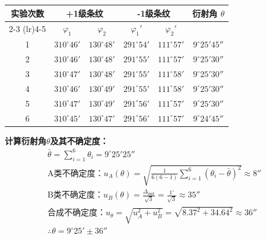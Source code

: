 \documentclass[10pt,a4paper]{ctexart}
\begin{document}
    \begin{table}[H] %
    \centering 
    \label{tab:my_experiment} 
    \begin{tabular}{*{6}{c}}
        \toprule
        \multirow{2}{*}{实验次数} & \multicolumn{2}{c}{+1级条纹} & \multicolumn{2}{c}{-1级条纹} & \multirow{2}{*}{衍射角 $\theta$} \\
        \cmidrule(lr){2-3} \cmidrule(lr){4-5}
        & \multicolumn{1}{c|}{$\varphi _1$} & $\varphi _2$ & \multicolumn{1}{c|}{$\varphi _1'$} & $\varphi _2'$ &  \\ %
        
        \midrule
        1 & $310^\circ46'$& $130^\circ48'$& $291^\circ54'$& $111^\circ57'$& $9^\circ25'45''$ \\

        2 & $310^\circ46'$& $130^\circ48'$& $291^\circ55'$& $111^\circ57'$& $9^\circ25'30''$ \\

        3 & $310^\circ47'$& $130^\circ48'$& $291^\circ55'$& $111^\circ58'$& $9^\circ25'30''$ \\
 
        4 & $310^\circ46'$& $130^\circ49'$& $291^\circ55'$& $111^\circ58'$& $9^\circ25'30''$ \\

        5 & $310^\circ47'$& $130^\circ49'$& $291^\circ56'$& $111^\circ57'$& $9^\circ25'30''$ \\

        6 & $310^\circ45'$& $130^\circ47'$& $291^\circ56'$& $111^\circ57'$& $9^\circ24'45''$ \\
        \bottomrule
    \end{tabular}
\end{table}
\textbf{计算衍射角$\theta $及其不确定度：}
\begin{gather*}
    \bar{\theta} = \sum_{i=1}^{6} \theta _i= 9^\circ 25' 25'' \\
    \text{A类不确定度：}u_A(\theta) = \sqrt{\frac{1}{6(6-1)} \sum_{i=1}^{6} (\theta _i - \bar{\theta })^2} \approx 8'' \\
    \text{B类不确定度：}u_B(\theta) = \frac{\Delta_{\text{inst}}}{\sqrt{3}} = \frac{1'}{\sqrt{3}} \approx 35'' \\
    \text{合成不确定度：}u_\theta = \sqrt{u_A^2 + u_B^2} = \sqrt{8.37^2 + 34.64^2} \approx 36'' \\
    \therefore \theta = 9^\circ 25' \pm 36'' 
\end{gather*}
\end{document}
